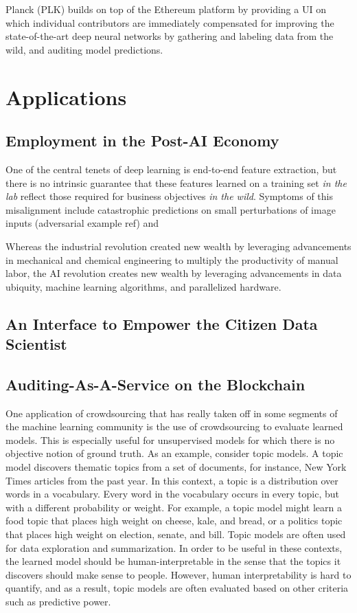 \documentclass[12pt]{article}
\begin{document}
Planck (PLK) builds on top of the Ethereum platform by providing a UI on which individual contributors are immediately compensated for improving the state-of-the-art deep neural networks by gathering and labeling data from the wild, and auditing model predictions.


\section{Applications}
\subsection{Employment in the Post-AI Economy}
One of the central tenets of deep learning is end-to-end feature extraction, but there is no intrinsic guarantee that these features learned on a training set \emph{in the lab} reflect those required for business objectives \emph{in the wild}.  Symptoms of this misalignment include catastrophic predictions on small perturbations of image inputs (adversarial example ref) and 

Whereas the industrial revolution created new wealth by leveraging advancements in mechanical and chemical engineering to multiply the productivity of manual labor, the AI revolution creates new wealth by leveraging advancements in data ubiquity, machine learning algorithms, and parallelized hardware.

\subsection{An Interface to Empower the Citizen Data Scientist}


\subsection{Auditing-As-A-Service on the Blockchain}
One application of crowdsourcing that has really taken off in some segments of the machine learning community
is the use of crowdsourcing to evaluate learned models. This is especially useful for unsupervised
models for which there is no objective notion of ground truth.
As an example, consider topic models. A topic model discovers thematic topics from a set of documents,
for instance, New York Times articles from the past year. In this context, a topic is a distribution over words
in a vocabulary. Every word in the vocabulary occurs in every topic, but with a different probability or
weight. For example, a topic model might learn a food topic that places high weight on cheese, kale,
and bread, or a politics topic that places high weight on election, senate, and bill.
Topic models are often used for data exploration and summarization. In order to be useful in these contexts,
the learned model should be human-interpretable in the sense that the topics it discovers should make sense
to people. However, human interpretability is hard to quantify, and as a result, topic models are often
evaluated based on other criteria such as predictive power.
\end{document}

